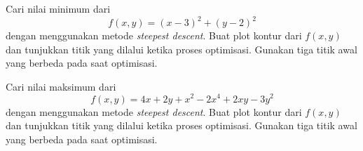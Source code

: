 \begin{soal}
Cari nilai minimum dari
\begin{equation*}
f(x,y) = (x - 3)^2 + (y - 2)^2
\end{equation*}
dengan menggunakan metode \textit{steepest descent}. Buat plot kontur
dari $f(x,y)$ dan tunjukkan titik yang dilalui ketika proses optimisasi.
Gunakan tiga titik awal yang berbeda pada saat optimisasi.
\end{soal}


\begin{soal}
Cari nilai maksimum dari
\begin{equation*}
f(x,y) = 4x + 2y + x^2 - 2x^4 + 2xy - 3y^2
\end{equation*}
dengan menggunakan metode \textit{steepest descent}.
Buat plot kontur
dari $f(x,y)$ dan tunjukkan titik yang dilalui ketika proses optimisasi.
Gunakan tiga titik awal yang berbeda pada saat optimisasi.
\end{soal}
